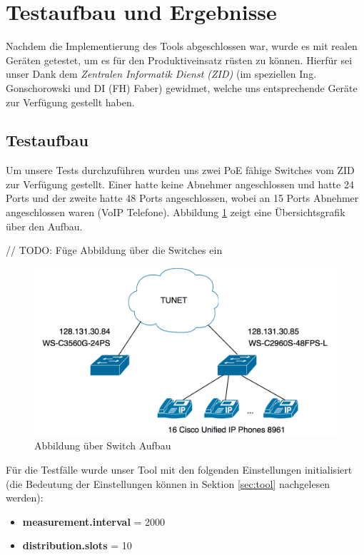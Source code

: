 \section{Testaufbau und Ergebnisse}
\label{sec:test}
Nachdem die Implementierung des Tools abgeschlossen war, wurde es mit realen Geräten getestet, um es für den Produktiveinsatz rüsten zu können. Hierfür sei unser Dank dem \emph{Zentralen Informatik Dienst (ZID)} (im speziellen Ing. Gonschorowski und DI (FH) Faber) gewidmet, welche uns entsprechende Geräte zur Verfügung gestellt haben.

\subsection{Testaufbau}
Um unsere Tests durchzuführen wurden uns zwei PoE fähige Switches vom ZID zur Verfügung gestellt. Einer hatte keine Abnehmer angeschlossen und hatte 24 Ports und der zweite hatte 48 Ports angeschlossen, wobei an 15 Ports Abnehmer angeschlossen waren (VoIP Telefone). Abbildung \ref{fig:switches} zeigt eine Übersichtsgrafik über den Aufbau.

// TODO: Füge Abbildung über die Switches ein
\begin{figure}[h]
    \centering
    \leavevmode
    \includegraphics[width=2.0\linewidth]{figures/network_diagram}
    \caption{Abbildung über Switch Aufbau}
    \label{fig:switches}
\end{figure}

Für die Testfälle wurde unser Tool mit den folgenden Einstellungen initialisiert (die Bedeutung der Einstellungen können in Sektion \ref{sec:tool} nachgelesen werden):
\begin{itemize}
 \item \textbf{measurement.interval} = 2000
 \item \textbf{distribution.slots} = 10
\end{itemize}

